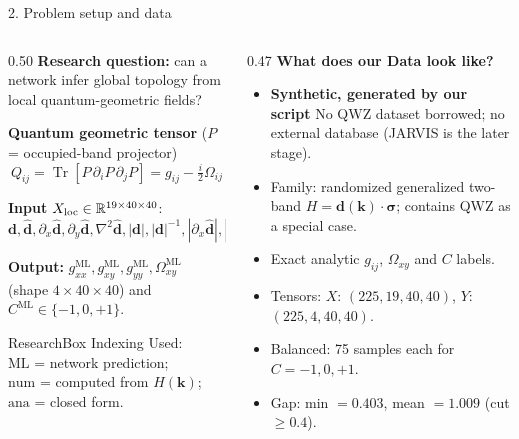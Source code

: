 \documentclass[aspectratio=169,11pt]{beamer}
\newcommand{\ML}{\mathrm{ML}}
\newcommand{\NUM}{\mathrm{num}}
\newcommand{\ANA}{\mathrm{ana}}
\newenvironment{ResearchBox}
{\begin{beamercolorbox}[rounded=true,sep=0.45em]{ResearchBox}}
{\end{beamercolorbox}}
\begin{document}
\begin{frame}{2. Problem setup and data}
\footnotesize

\begin{columns}[T]
\begin{column}{0.50\textwidth}
\textbf{Research question:} can a network infer global topology from local
quantum-geometric fields?

\vspace{0.08cm}
\textbf{Quantum geometric tensor} ($P$ = occupied-band projector)
\[
Q_{ij}=\operatorname{Tr}[P\,\partial_iP\,\partial_jP]=g_{ij}-\tfrac{i}{2}\Omega_{ij}
\]

\textbf{Input} $X_{\rm loc}\in\mathbb R^{19\times40\times40}$:\\
{\scriptsize $\mathbf d,\hat{\mathbf d},\partial_x\hat{\mathbf d},\partial_y\hat{\mathbf d},
\nabla^2\hat{\mathbf d},|\mathbf d|,|\mathbf d|^{-1},|\partial_x\hat{\mathbf d}|,|\partial_y\hat{\mathbf d}|$}

\textbf{Output:} $g^{\ML}_{xx},g^{\ML}_{xy},g^{\ML}_{yy},\Omega^{\ML}_{xy}$ (shape $4\times40\times40$)
and $C^{\ML}\in\{-1,0,+1\}$.

\vspace{0.08cm}
\begin{ResearchBox}\scriptsize
Indexing Used: \\
$\ML$ = network prediction;\\ $\NUM$ = computed from $H(\mathbf k)$;\\
$\ANA$ = closed form.
\end{ResearchBox}
\end{column}

\begin{column}{0.47\textwidth}
\textbf{What does our Data look like?}
\begin{itemize}
    \item \textbf{Synthetic, generated by our script}
    No QWZ dataset borrowed; no external database
    (JARVIS is the later stage).
    \item Family: randomized generalized two-band
    $H=\mathbf d(\mathbf k)\!\cdot\!\boldsymbol\sigma$; contains QWZ as a special case.
    \item Exact analytic $g_{ij}$, $\Omega_{xy}$ and $C$ labels.
    \item Tensors: $X$: $(225,19,40,40)$, $Y$: $(225,4,40,40)$.
    \item Balanced: 75 samples each for $C=-1,0,+1$.
    \item Gap: min $=0.403$, mean $=1.009$ (cut $\geq0.4$).
\end{itemize}
\end{column}
\end{columns}
\end{frame}
\end{document}

